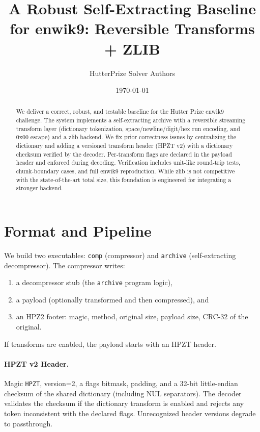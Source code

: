\documentclass[11pt]{article}
\title{A Robust Self-Extracting Baseline for enwik9: Reversible Transforms + ZLIB}
\author{HutterPrize Solver Authors}
\date{\today}
\begin{document}
\maketitle
\begin{abstract}
We deliver a correct, robust, and testable baseline for the Hutter Prize enwik9 challenge. The system implements a self-extracting archive with a reversible streaming transform layer (dictionary tokenization, space/newline/digit/hex run encoding, and 0x00 escape) and a zlib backend. We fix prior correctness issues by centralizing the dictionary and adding a versioned transform header (HPZT v2) with a dictionary checksum verified by the decoder. Per-transform flags are declared in the payload header and enforced during decoding. Verification includes unit-like round-trip tests, chunk-boundary cases, and full enwik9 reproduction. While zlib is not competitive with the state-of-the-art total size, this foundation is engineered for integrating a stronger backend.
\end{abstract}

\section{Format and Pipeline}
We build two executables: \texttt{comp} (compressor) and \texttt{archive} (self-extracting decompressor). The compressor writes:
\begin{enumerate}[noitemsep]
  \item a decompressor stub (the \texttt{archive} program logic),
  \item a payload (optionally transformed and then compressed), and
  \item an HPZ2 footer: magic, method, original size, payload size, CRC-32 of the original.
\end{enumerate}
If transforms are enabled, the payload starts with an HPZT header.

\paragraph{HPZT v2 Header.} Magic \texttt{HPZT}, version=2, a flags bitmask, padding, and a 32-bit little-endian checksum of the shared dictionary (including NUL separators). The decoder validates the checksum if the dictionary transform is enabled and rejects any token inconsistent with the declared flags. Unrecognized header versions degrade to passthrough.
\end{document}
